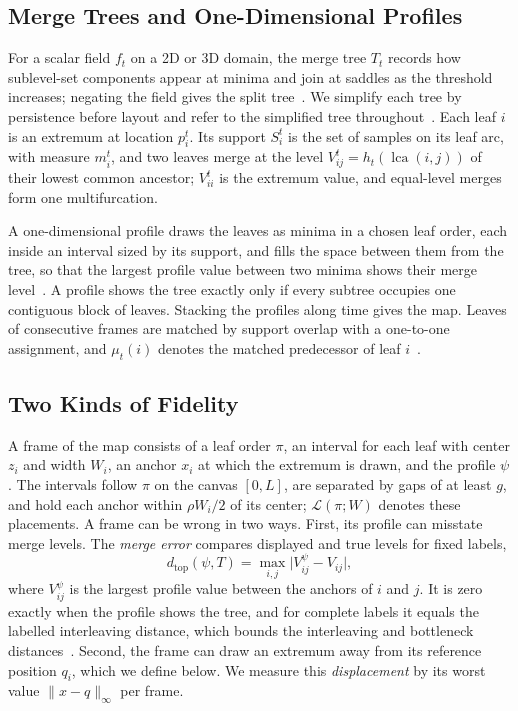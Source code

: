 \documentclass[preprint]{vgtc}   %
\newcommand{\dtop}{d_{\mathrm{top}}}
\newcommand{\lca}{\operatorname{lca}}
\begin{document}
\subsection{Merge Trees and One-Dimensional Profiles}\label{sec:background}
For a scalar field $f_t$ on a 2D or 3D domain, the merge tree $T_t$ records how sublevel-set components appear at minima and join at saddles as the threshold increases; negating the field gives the split tree~\cite{Heine:2016:Survey,Tierny:2018:TTK}. We simplify each tree by persistence before layout and refer to the simplified tree throughout~\cite{Edelsbrunner:2002:TPS}. Each leaf $i$ is an extremum at location $p_i^t$. Its support $S_i^t$ is the set of samples on its leaf arc, with measure $m_i^t$, and two leaves merge at the level $V_{ij}^t=h_t(\lca(i,j))$ of their lowest common ancestor; $V_{ii}^t$ is the extremum value, and equal-level merges form one multifurcation.

A one-dimensional profile draws the leaves as minima in a chosen leaf order, each inside an interval sized by its support, and fills the space between them from the tree, so that the largest profile value between two minima shows their merge level~\cite{Weber:2007:TL,Oesterling:2013:TLP,Koepp:2023:TMTM}. A profile shows the tree exactly only if every subtree occupies one contiguous block of leaves. Stacking the profiles along time gives the map. Leaves of consecutive frames are matched by support overlap with a one-to-one assignment, and $\mu_t(i)$ denotes the matched predecessor of leaf $i$~\cite{STMTM:2026}.

\subsection{Two Kinds of Fidelity}\label{sec:common}
A frame of the map consists of a leaf order $\pi$, an interval for each leaf with center $z_i$ and width $W_i$, an anchor $x_i$ at which the extremum is drawn, and the profile $\psi$. The intervals follow $\pi$ on the canvas $[0,L]$, are separated by gaps of at least $g$, and hold each anchor within $\rho W_i/2$ of its center; $\mathcal{L}(\pi;W)$ denotes these placements. A frame can be wrong in two ways. First, its profile can misstate merge levels. The \emph{merge error} compares displayed and true levels for fixed labels,
\begin{equation}\label{eq:dtop}
 \dtop(\psi,T)=\max_{i,j}\bigl|V_{ij}^{\psi}-V_{ij}\bigr|,
\end{equation}
where $V_{ij}^{\psi}$ is the largest profile value between the anchors of $i$ and $j$. It is zero exactly when the profile shows the tree, and for complete labels it equals the labelled interleaving distance, which bounds the interleaving and bottleneck distances~\cite{Munch:2019:LINF,Gasparovic:2024:IID,Morozov:2013:IDMT}. Second, the frame can draw an extremum away from its reference position $q_i$, which we define below. We measure this \emph{displacement} by its worst value $\|x-q\|_\infty$ per frame.
\end{document}
